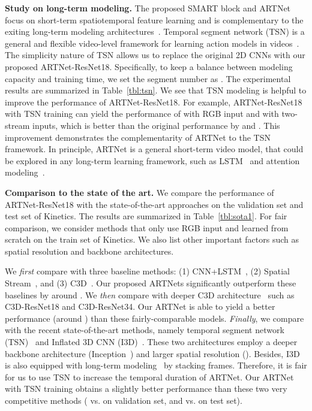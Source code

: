 \documentclass[10pt,twocolumn,letterpaper]{article}
\begin{document}
{\bf Study on long-term modeling.} The proposed SMART block and ARTNet focus on short-term spatiotemporal feature learning and is complementary to the exiting long-term modeling architectures~\cite{VarolLS16,WangXWQLTV16,NgHVVMT15}. Temporal segment network (TSN) is a general and flexible video-level framework for learning action models in videos~\cite{WangXWQLTV16}. The simplicity nature of TSN allows us to replace the original 2D CNNs with our proposed ARTNet-ResNet18. Specifically, to keep a balance between modeling capacity and training time, we set the segment number as . The experimental results are summarized in Table~\ref{tbl:tsn}. We see that TSN modeling is helpful to improve the performance of ARTNet-ResNet18. For example, ARTNet-ResNet18 with TSN training can yield the performance of  with RGB input and  with two-stream inputs, which is better than the original performance by  and . This improvement demonstrates the complementarity of ARTNet to the TSN framework. In principle, ARTNet is a general short-term video model, that could be explored in any long-term learning framework, such as LSTM~\cite{NgHVVMT15,DonahueHGRVDS15} and attention modeling~\cite{WangXLV17}.

{\bf Comparison to the state of the art.} We compare the performance of ARTNet-ResNet18 with the state-of-the-art approaches on the validation set and test set of Kinetics. The results are summarized in Table~\ref{tbl:sota1}. For fair comparison, we consider methods that only use RGB input and learned from scratch on the train set of Kinetics. We also list other important factors such as spatial resolution and backbone architectures. 

We {\em first} compare with three baseline methods: (1) CNN+LSTM~\cite{NgHVVMT15,DonahueHGRVDS15}, (2) Spatial Stream~\cite{SimonyanZ14}, and (3) C3D~\cite{TranBFTP15}. Our proposed ARTNets significantly outperform these baselines by around . We {\em then} compare with deeper C3D architecture~\cite{Tran17} such as C3D-ResNet18 and C3D-ResNet34. Our ARTNet is able to yield a better performance (around ) than these fairly-comparable models. {\em Finally}, we compare with the recent state-of-the-art methods, namely temporal segment network (TSN)~\cite{WangXWQLTV16} and Inflated 3D CNN (I3D)~\cite{CarreiraZ17}. These two architectures employ a deeper backbone architecture (Inception~\cite{SzegedyLJSRAEVR15}) and larger spatial resolution (). Besides, I3D is also equipped with long-term modeling~\cite{VarolLS16} by stacking  frames. Therefore, it is fair for us to use TSN to increase the temporal duration of ARTNet. Our ARTNet with TSN training obtains a slightly better performance than these two very competitive methods ( vs.  on validation set, and  vs.  on test set). 
\end{document}
